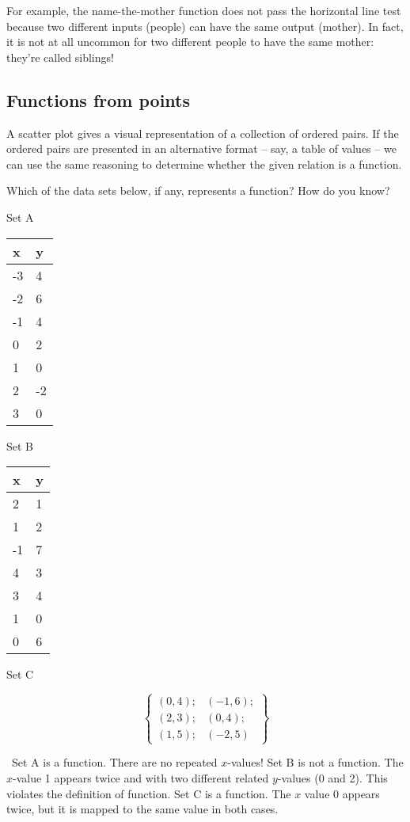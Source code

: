 For example, the name-the-mother function does not pass the horizontal line test because two different inputs (people) can have the same output (mother). In fact, it is not at all uncommon for two different people to have the same mother: they're called siblings!

\subsection{Functions from points}

A scatter plot gives a visual representation of a collection of ordered pairs. If the ordered pairs are presented in an alternative format -- say, a table of values -- we can use the same reasoning to determine whether the given relation is a function.

\begin{boxedex}
Which of the data sets below, if any, represents a function? How do you know?

\begin{minipage}[t]{0.33\textwidth}
\centering
Set A
\par\begin{tabular}{|C{1.5cm}|C{1.5cm}|}
\hline
x & y \\ & 4\\
-2 & 6\\
-1 & 4\\
0 & 2\\
1 & 0\\
2 & -2\\
3 & 0\\\hline
\end{tabular}
\end{minipage}
\begin{minipage}[t]{0.33\textwidth}
\centering
Set B
\par\begin{tabular}{|C{1.5cm}|C{1.5cm}|}
\hline
x & y \\ & 1\\
1 & 2\\
-1 & 7\\
4 & 3\\
3 & 4\\
1 & 0\\
0 & 6\\\hline
\end{tabular}
\end{minipage}
\begin{minipage}[t]{0.33\textwidth}
\centering
Set C
\par
\[\left\{\begin{array}{ll}
(0,4); &(-1,6);\\
(2,3); &(0,4);\\
(1,5); &(-2,5)
\end{array}\right\}\]
\end{minipage}

\exsoln\ Set A is a function. There are no repeated $x$-values! Set B is not a function. The $x$-value 1 appears twice and with two different related $y$-values (0 and 2). This violates the definition of function. Set C is a function. The $x$ value 0 appears twice, but it is mapped to the same value in both cases.
\end{boxedex}

